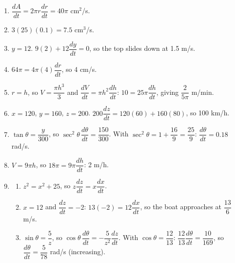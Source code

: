 \documentclass[11pt]{article}
\begin{document}
\newpage
\begin{solbox}
\begin{enumerate}[leftmargin=*,itemsep=4pt]
  \item $\dfrac{dA}{dt}=2\pi r\dfrac{dr}{dt}=40\pi$ cm$^2$/s.
  \item $3(25)(0.1)=7.5$ cm$^3$/s.
  \item $y=12$. $9(2)+12\dfrac{dy}{dt}=0$, so the top slides down at 1.5 m/s.
  \item $64\pi=4\pi(4)\dfrac{dr}{dt}$, so 4 cm/s.
  \item $r=h$, so $V=\dfrac{\pi h^3}{3}$ and $\dfrac{dV}{dt}=\pi h^2\dfrac{dh}{dt}$: $10=25\pi\dfrac{dh}{dt}$, giving $\dfrac{2}{5\pi}$ m/min.
  \item $x=120$, $y=160$, $z=200$. $200\dfrac{dz}{dt}=120(60)+160(80)$, so 100 km/h.
  \item $\tan\theta=\dfrac{y}{300}$, so $\sec^2\theta\,\dfrac{d\theta}{dt}=\dfrac{150}{300}$. With $\sec^2\theta=1+\dfrac{16}{9}=\dfrac{25}{9}$: $\dfrac{d\theta}{dt}=0.18$ rad/s.
  \item $V=9\pi h$, so $18\pi=9\pi\dfrac{dh}{dt}$: 2 m/h.
  \item \begin{enumerate}[label=(\alph*),leftmargin=*,itemsep=3pt]
    \item $z^2=x^2+25$, so $z\dfrac{dz}{dt}=x\dfrac{dx}{dt}$.
    \item $x=12$ and $\dfrac{dz}{dt}=-2$: $13(-2)=12\dfrac{dx}{dt}$, so the boat approaches at $\dfrac{13}{6}$ m/s.
    \item $\sin\theta=\dfrac5z$, so $\cos\theta\,\dfrac{d\theta}{dt}=-\dfrac{5}{z^2}\dfrac{dz}{dt}$. With $\cos\theta=\dfrac{12}{13}$: $\dfrac{12}{13}\dfrac{d\theta}{dt}=\dfrac{10}{169}$, so $\dfrac{d\theta}{dt}=\dfrac{5}{78}$ rad/s (increasing).
  \end{enumerate}
\end{enumerate}
\end{solbox}
\end{document}
